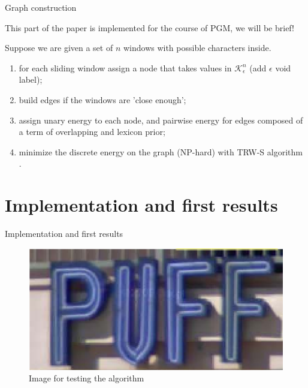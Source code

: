 \documentclass[handout]{beamer}
\begin{document}
\begin{frame}{Graph construction}
\begin{alertblock}{}
This part of the paper is implemented for the course of PGM, we will be brief!
\end{alertblock}
Suppose we are given a set of $n$ windows with possible characters inside.
\begin{enumerate}
	\item for each sliding window assign a node that takes values in $\mathcal{K}_{\epsilon}^n$ (add $\epsilon$ void label);
	\item build edges if the windows are 'close enough';
	\item assign unary energy to each node, and pairwise energy for edges composed of a term of overlapping and lexicon prior;
	\item minimize the discrete energy on the graph (NP-hard) with TRW-S algorithm \cite{Kol}.
\end{enumerate}

\end{frame}




\section{Implementation and first results}

\begin{frame}{Implementation and first results}
\begin{figure}%
\includegraphics[width=\columnwidth]{figures/puffTest.png}%
\caption{Image for testing the algorithm}%
\label{}%
\end{figure}
\end{frame}
\end{document}
